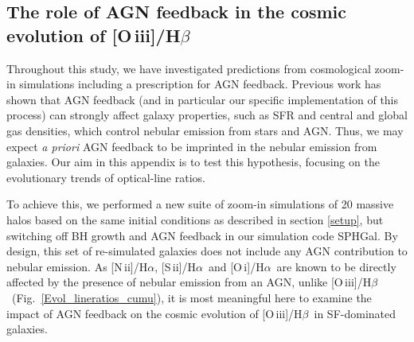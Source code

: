 \documentclass[fleqn,usenatbib]{mnras}
\newcommand{\oiiihb}{\hbox{[O\,{\sc iii}]/H$\beta$}}
\newcommand{\niiha}{\hbox{[N\,{\sc ii}]/H$\alpha$}}
\newcommand{\siiha}{\hbox{[S\,{\sc ii}]/H$\alpha$}}
\newcommand{\oiha}{\hbox{[O\,{\sc i}]/H$\alpha$}}
\begin{document}





\begin{appendix}
\section{The role of AGN feedback in the cosmic evolution of \oiiihb\ }\label{AGNfeedback}

\begin{figure*}
\centering
{}
 \caption{Same as Fig. \ref{BPT_SFoffset}, but for
 the simulation set of galaxies {\em without} AGN feedback, as described in Appendix~\ref{AGNfeedback}.}
 \label{BPT_SFoffset_NoAGN}      
\end{figure*}

\begin{figure*}
\caption{Same as the first two rows of Fig. \ref{Propevol}, but for
 the simulation set of galaxies {\em without} AGN feedback, as described in Appendix~\ref{AGNfeedback}.}
 \label{Propevol_NoAGN}        
\end{figure*}

Throughout this study, we have investigated predictions from
  cosmological zoom-in simulations including a prescription for AGN feedback.
Previous work \citep[e.g.,][]{Choi16} has shown that
  AGN feedback (and in particular our specific implementation of this process)
  can strongly affect galaxy properties, such as SFR and central and
  global gas densities, which control nebular emission from stars and AGN.
  Thus, we may expect {\em a priori} AGN
  feedback to be imprinted in the nebular emission from  
  galaxies. Our aim in this appendix is to test this hypothesis,
  focusing on the evolutionary trends of optical-line ratios.

 To achieve this, we performed a new suite of zoom-in simulations of  
  20 massive halos based on the same initial conditions as
  described in section \ref{setup}, but switching off BH growth and
  AGN feedback in our simulation code SPHGal. By design,
this set of re-simulated galaxies does not include any 
AGN contribution to nebular emission. As \niiha, \siiha\ and \oiha\ 
are known to be directly affected by the presence of nebular emission
from an AGN, unlike
\oiiihb\  (Fig.~\ref{Evol_lineratios_cumu}), it is most meaningful here
to examine the impact of AGN feedback on the cosmic evolution of
  \oiiihb\ in
SF-dominated galaxies.  


\end{appendix}
\end{document}

